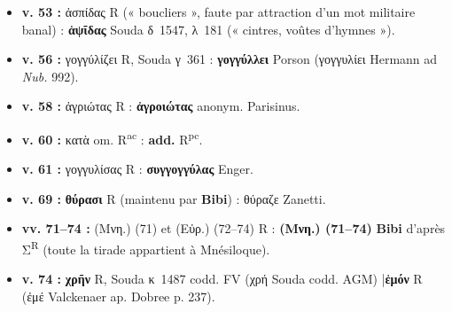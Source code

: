 \documentclass[10pt, a4paper, twoside]{book}
\renewcommand{\_}{\origunderscore\penalty0\relax}
\providecommand{\italique}[1]{\emph{#1}}
\providecommand{\lecon}[1]{\textbf{#1}}
\providecommand{\expo}[1]{\textsuperscript{#1}}
\providecommand{\Rac}{R\expo{ac}}
\providecommand{\Rpc}{R\expo{pc}}
\providecommand{\espApp}{\hspace{0.5em}|\hspace{0.5em}}
\begin{document}
\begin{itemize}
\begin{itemize}
    \item \textbf{v. 53 :} ἀσπίδας R (« boucliers », faute par attraction d'un mot militaire banal) : \lecon{ἁψῖδας} Souda δ~1547, λ~181 (« cintres, voûtes d'hymnes »).
    \item \textbf{v. 56 :} γογγύλίζει R, Souda γ~361 : \lecon{γογγύλλει} Porson (γογγυλίει Hermann ad \italique{Nub.} 992).
    \item \textbf{v. 58 :} ἀγριώτας R : \lecon{ἀγροιώτας} anonym. Parisinus.
    \item \textbf{v. 60 :} κατὰ om. \Rac{} : \textbf{add.} \Rpc{}.
    \item \textbf{v. 61 :} γογγυλίσας R : \lecon{συγγογγύλας} Enger.
    \item \textbf{v. 69 :} \lecon{θύρασι} R (maintenu par \textbf{Bibi}) : θύραζε Zanetti.
    \item \textbf{vv. 71–74 :} (Μνη.) (71) et (Εὐρ.) (72–74) R : \lecon{(Μνη.) (71–74)} \lecon{Bibi} d'après Σ\textsuperscript{R} (toute la tirade appartient à Mnésiloque).
    \item \textbf{v. 74 :} \lecon{χρῆν} R, Souda κ~1487 codd. FV (χρή Souda codd. AGM) \espApp \lecon{ἐμόν} R (ἐμέ Valckenaer ap. Dobree p. 237).
  \end{itemize}
\end{itemize}
\end{document}
